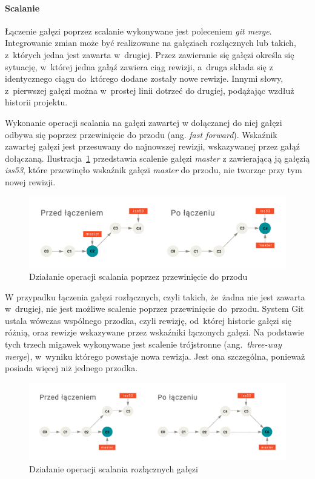 \documentclass[12pt,a4paper,polish,thesis]{dcsbook}
\begin{document}
	\paragraph{Scalanie}

	Łączenie gałęzi poprzez scalanie wykonywane jest poleceniem \textit{git merge}. Integrowanie zmian może być realizowane na gałęziach rozłącznych lub takich, z~których jedna jest zawarta w~drugiej. Przez zawieranie się gałęzi określa się sytuację, w~której jedna gałąź zawiera ciąg rewizji, a~druga składa się z identycznego ciągu do~którego dodane zostały nowe rewizje. Innymi słowy, z~pierwszej gałęzi można w~prostej linii dotrzeć do drugiej, podążając wzdłuż historii projektu.

	Wykonanie operacji scalania na gałęzi zawartej w dołączanej do niej gałęzi odbywa się poprzez przewinięcie do przodu (ang. \textit{fast forward}). Wskaźnik zawartej gałęzi jest przesuwany do najnowszej rewizji, wskazywanej przez gałąź dołączaną. Ilustracja~\ref{fig:git-merge_ff} przedstawia scalenie gałęzi \textit{master} z zawierającą ją gałęzią \textit{iss53}, które przewinęło wskaźnik gałęzi \textit{master} do przodu, nie tworząc przy tym nowej rewizji.

	\begin{figure}[h]
		\centering
		\includegraphics[width=14cm]{git-merge_ff}
		\caption{Działanie operacji scalania poprzez przewinięcie do przodu}
		\label{fig:git-merge_ff}
	\end{figure}

	W przypadku łączenia gałęzi rozłącznych, czyli takich, że~żadna nie jest zawarta w~drugiej, nie jest możliwe scalenie poprzez przewinięcie do~przodu. System Git ustala wówczas wspólnego przodka, czyli rewizję, od~której historie gałęzi się różnią, oraz rewizje wskazywane przez wskaźniki łączonych gałęzi. Na podstawie tych trzech migawek wykonywane jest scalenie trójstronne (ang.~\textit{three-way merge}), w~wyniku którego powstaje nowa rewizja. Jest ona szczególna, ponieważ posiada więcej niż jednego przodka.

	\begin{figure}[h]
		\centering
		\includegraphics[width=15cm]{git-merge_no_ff}
		\caption{Działanie operacji scalania rozłącznych gałęzi}
		\label{fig:git-merge_no_ff}
	\end{figure}
\end{document}
